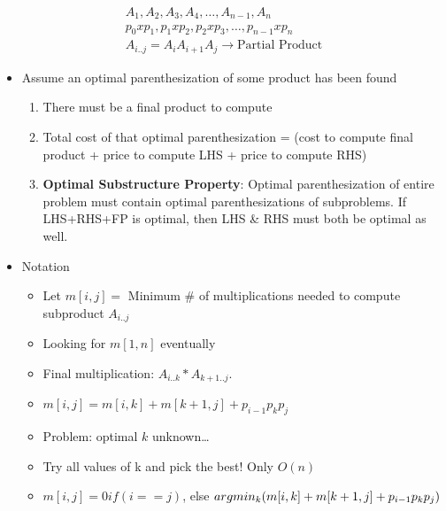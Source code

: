 \documentclass[12pt, letter]{article}
\begin{document}
\begin{gather*}
A_1,A_2,A_3,A_4, \ldots, A_{n-1}, A_n \\
p_0 x p_1, p_1 x p_2, p_2 x p_3, \ldots, p_{n-1} x p_n \\
A_{i..j} = A_iA_{i+1}A_j \rightarrow \text{Partial Product}
\end{gather*}

\begin{itemize}
	\item Assume an optimal parenthesization of some product has been found
	\begin{enumerate}
		\item There must be a final product to compute
		\item Total cost of that optimal parenthesization = (cost to compute final product + price to compute LHS + price to compute RHS)
		\item \textbf{Optimal Substructure Property}: Optimal parenthesization of entire problem must contain optimal parenthesizations of subproblems. If LHS+RHS+FP is optimal, then LHS \& RHS must both be optimal as well.
	\end{enumerate}
	\item Notation
	\begin{itemize}
		\item Let $m[i,j] = $ Minimum \# of multiplications needed to compute subproduct $A_{i..j}$ 
		\item Looking for $m[1,n]$ eventually
		\item Final multiplication:  $A_{i..k}*A_{k+1..j}$.
		\item $m[i,j] = m[i,k] + m[k+1,j] + p_{i-1}p_kp_j$
		\item Problem: optimal $k$ unknown\ldots
		\item Try all values of k and pick the best! Only $O(n)$
		\item $m[i,j] = 0 if (i == j)$, else $argmin_k(m[i,k]+m[k+1,j]+p_{i-1}p_kp_j) \\$
	\end{itemize}
\end{itemize}
\end{document}
